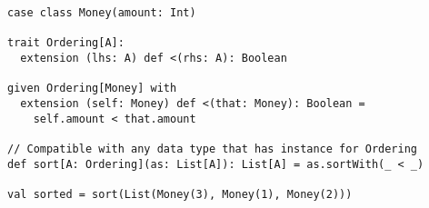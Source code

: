 \begin{algorithm}
\begin{verbatim}
case class Money(amount: Int)

trait Ordering[A]:
  extension (lhs: A) def <(rhs: A): Boolean

given Ordering[Money] with
  extension (self: Money) def <(that: Money): Boolean =
    self.amount < that.amount

// Compatible with any data type that has instance for Ordering
def sort[A: Ordering](as: List[A]): List[A] = as.sortWith(_ < _)

val sorted = sort(List(Money(3), Money(1), Money(2)))
\end{verbatim}

\caption{Definition, implementation and use of the Ordering type class in Scala.%
\label{typeclass}}
\end{algorithm}